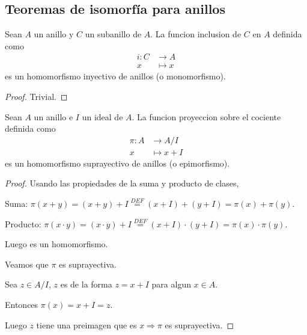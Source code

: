 \subsection{Teoremas de isomorfía para anillos}
\begin{proposition}
	Sean \(A \) un anillo y \(C \) un subanillo de \(A \). La funcion inclusion de \(C \) en \(A \) definida como
	\[
		\begin{aligned}
			i \colon C & \longrightarrow A \\
			x          & \longmapsto x
		\end{aligned}
	\]
	es un homomorfismo inyectivo de anillos (o monomorfismo).
\end{proposition}
\begin{proof}
	Trivial.
\end{proof}
\begin{proposition}
	Sean \(A \) un anillo e \(I \) un ideal de \(A \). La funcion proyeccion sobre el cociente definida como
	\[
		\begin{aligned}
			\pi \colon A & \longrightarrow A/I \\
			x            & \longmapsto x + I
		\end{aligned}
	\]
	es un homomorfismo suprayectivo de anillos (o epimorfismo).
\end{proposition}
\begin{proof}
	Usando las propiedades de la suma y producto de clases,
	
	Suma: \(\pi(x + y) = (x + y) + I \overset{DEF}{=} (x + I) + (y + I) = \pi(x) + \pi(y)\).
	
	Producto: \(\pi(x \cdot y) = (x \cdot y) + I \overset{DEF}{=} (x + I) \cdot (y + I) = \pi(x) \cdot \pi(y)\).
	
	Luego es un homomorfismo.
	
	Veamos que \(\pi \) es suprayectiva.
	
	Sea \(z \in A/I \), \(z \) es de la forma \(z = x + I \) para algun \(x \in A \).
	
	Entonces \(\pi(x) = x + I = z \).
	
	Luego \(z \) tiene una preimagen que es \(x \Rightarrow \pi\) es suprayectiva.
\end{proof}

